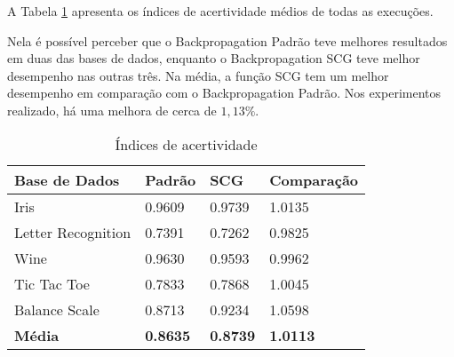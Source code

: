 A Tabela \ref{tabela-indices-acertividade} apresenta os índices de acertividade médios de todas as execuções. 

Nela é possível perceber que o Backpropagation Padrão teve melhores resultados em duas das bases de dados, enquanto o Backpropagation SCG teve melhor desempenho nas outras três. Na média, a função SCG tem um melhor desempenho em comparação com o Backpropagation Padrão. Nos experimentos realizado, há uma melhora de cerca de $1,13\%$.

\begin{table}[h!]
\centering
\caption{Índices de acertividade}
\label{tabela-indices-acertividade}
\begin{tabular}{@{}llll@{}}
\toprule
\textbf{Base de Dados} & \textbf{Padrão} & \textbf{SCG} & \textbf{Comparação} \\ \midrule
Iris                   & 0.9609                          & 0.9739 & 1.0135                       \\
Letter Recognition     & 0.7391                          & 0.7262 & 0.9825                      \\
Wine                   & 0.9630                          & 0.9593 & 0.9962                       \\
Tic Tac Toe            & 0.7833                          & 0.7868 & 1.0045                       \\
Balance Scale          & 0.8713                          & 0.9234 & 1.0598                       \\ \bottomrule
\textbf{Média}		   & \textbf{0.8635}							 & \textbf{0.8739} & \textbf{1.0113}
\end{tabular}
\end{table}